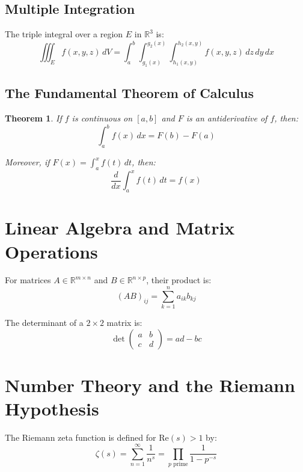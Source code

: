 \documentclass{article}
\newtheorem{theorem}{Theorem}
\begin{document}
\subsection{Multiple Integration}
The triple integral over a region $E$ in $\mathbb{R}^3$ is:
\begin{equation}
\iiint_E f(x,y,z) \, dV = \int_{a}^{b} \int_{g_1(x)}^{g_2(x)} \int_{h_1(x,y)}^{h_2(x,y)} f(x,y,z) \, dz \, dy \, dx
\end{equation}

\subsection{The Fundamental Theorem of Calculus}
\begin{theorem}
If $f$ is continuous on $[a,b]$ and $F$ is an antiderivative of $f$, then:
\begin{equation}
\int_a^b f(x) \, dx = F(b) - F(a)
\end{equation}

Moreover, if $F(x) = \int_a^x f(t) \, dt$, then:
\begin{equation}
\frac{d}{dx}\int_a^x f(t) \, dt = f(x)
\end{equation}
\end{theorem}

\section{Linear Algebra and Matrix Operations}

For matrices $A \in \mathbb{R}^{m \times n}$ and $B \in \mathbb{R}^{n \times p}$, their product is:
\begin{equation}
(AB)_{ij} = \sum_{k=1}^{n} a_{ik}b_{kj}
\end{equation}

The determinant of a $2 \times 2$ matrix is:
\begin{equation}
\det\begin{pmatrix} a & b \\ c & d \end{pmatrix} = ad - bc
\end{equation}

\section{Number Theory and the Riemann Hypothesis}

The Riemann zeta function is defined for $\text{Re}(s) > 1$ by:
\begin{equation}
\zeta(s) = \sum_{n=1}^{\infty} \frac{1}{n^s} = \prod_{p \text{ prime}} \frac{1}{1-p^{-s}}
\end{equation}
\end{document}

